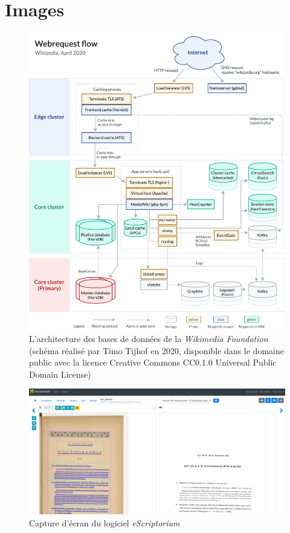 \chapter{Images}
\begin{figure}[p]
	\includegraphics[width=\textwidth]{annexes/wikimedia_db_2020.png}
	\caption{L'architecture des bases de données de la \textit{Wikimedia Foundation} (schéma réalisé par Timo Tijhof en 2020, disponible dans le domaine public avec la licence Creative Commons CC0.1.0 Universal Public Domain License)}
	\label{appendix:wikimedia_db}
\end{figure}

	\begin{figure}[p]
		\centering
		\includegraphics[width=\textheight,angle=90]{annexes/escriptorium.png}
		\caption{Capture d'écran du logiciel \textit{eScriptorium}}
		\label{appendix:escriptorium}
	\end{figure}